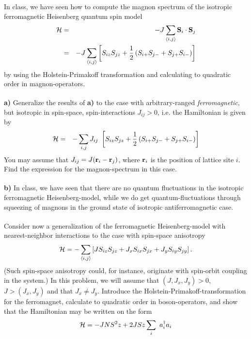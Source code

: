 \begin{problem}
In class, we have seen how to compute the magnon spectrum of the isotropic ferromagnetic Heisenberg quantum spin model
\begin{eqnarray}
	\mathcal{H} & = & - J \sum_{\langle i,j\rangle} {\bf S} _i \cdot {\bf S}_j \nonumber \\
	& = & -    J \sum_{\langle i,j\rangle} \left[S_{iz}  S_{jz} + \frac{1}{2}   \left(S_{i+} S_{j-} + S_{j+} S_{i-} \right)  \right] \nonumber
\end{eqnarray}  
by using the Holstein-Primakoff transformation and calculating to quadratic order in magnon-operators. 
\ \\
\ \\
{\bf a)} Generalize the results of {\bf a)} to the case with arbitrary-ranged {\it ferromagnetic}, but isotropic in spin-space, spin-interactions $J_{ij}>0$, i.e. the Hamiltonian is given by 
\begin{eqnarray}
	\mathcal{H}  & = & -  \sum_{i,j} J_{ij} ~ \left[S_{iz}  S_{jz} + \frac{1}{2}   \left(S_{i+} S_{j-} + S_{j+} S_{i-} \right)  \right] \nonumber
\end{eqnarray}  
You may assume that $J_{ij}= J({\bf r}_i-{\bf r}_j)$, where ${\bf r}_i$ is the position of lattice site $i$. Find the expression for the magnon-spectrum in this case. 
\ \\
\ \\
{\bf b)} In class, we have seen that there are no quantum fluctuations in the isotropic ferromagnetic Heisenberg-model, while we do get quantum-fluctuations through squeezing of magnons in the ground state of isotropic antiferromagnetic case. 
\ \\
\ \\
Consider now a generalization of the ferromagnetic Heisenberg-model with nearest-neighbor interactions to the case with spin-space anisotropy
\begin{eqnarray}
	\mathcal{H} = - \sum_{\langle i,j \rangle} \left[ J S_{iz} S_{jz} + J_x S_{ix} S_{jx} + J_y S_{iy} S_{jy} \right]. \nonumber
\end{eqnarray} 
(Such spin-space anisotropy could, for instance, originate with spin-orbit coupling in the system.) 
In this problem, we will assume that $(J,J_x,J_y) >0$, $J > (J_x,J_y) $ and that $J_x \neq J_y$. Introduce the Holstein-Primakoff-transformation for the ferromagnet, calculate to quadratic order in boson-operators, and show that the Hamiltonian may be written on the form
\begin{eqnarray}
	\Ha = -J N S^2 z + 2 J S z \sum_i ~ a^{\dagger}_i a_i 

\end{eqnarray}
\end{problem}
